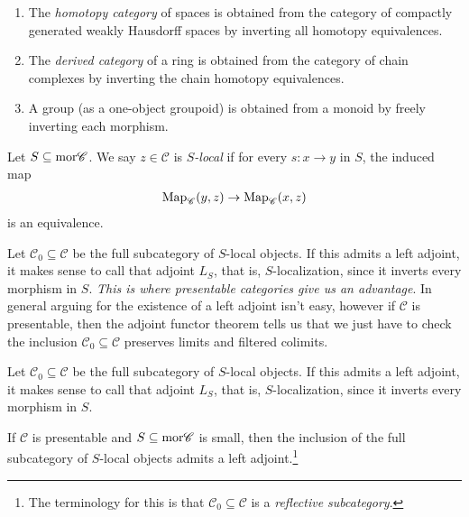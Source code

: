 \documentclass[11pt]{amsart}
\begin{document}
\begin{example} $\ $
\begin{enumerate}
    \item The \textit{homotopy category} of spaces is obtained from the category of compactly generated weakly Hausdorff spaces by inverting all homotopy equivalences.
    \item The \textit{derived category} of a ring is obtained from the category of chain complexes by inverting the chain homotopy equivalences.
    \item A group (as a one-object groupoid) is obtained from a monoid by freely inverting each morphism.
\end{enumerate}
\end{example}



\begin{definition} \cite[5.5.4.1]{HTT} Let $S \subseteq \mathrm{mor} \mathscr{C}$. We say $z\in \mathscr{C}$ is $S$\textit{-local} if for every $s \colon x \to y$ in $S$, the induced map
\begin{align*}
    \mathrm{Map}_{\mathscr{C}}(y,z) \to \mathrm{Map}_{\mathscr{C}}(x,z)
\end{align*}
is an equivalence.
\end{definition}

\begin{remark} Let $\mathscr{C}_0 \subseteq \mathscr{C}$ be the full subcategory of $S$-local objects. If this admits a left adjoint, it makes sense to call that adjoint $L_S$, that is, $S$-localization, since it inverts every morphism in $S$. \textit{This is where presentable categories give us an advantage}. In general arguing for the existence of a left adjoint isn't easy, however if $\mathscr{C}$ is presentable, then the adjoint functor theorem tells us that we just have to check the inclusion $\mathscr{C}_0 \subseteq \mathscr{C}$ preserves limits and filtered colimits.
\end{remark}
Let $\mathscr{C}_0 \subseteq \mathscr{C}$ be the full subcategory of $S$-local objects. If this admits a left adjoint, it makes sense to call that adjoint $L_S$, that is, $S$-localization, since it inverts every morphism in $S$.

\begin{proposition} \cite[5.5.4.15]{HTT} If $\mathscr{C}$ is presentable and $S \subseteq \mathrm{mor} \mathscr{C}$ is small, then the inclusion of the full subcategory of $S$-local objects admits a left adjoint.\footnote{The terminology for this is that $\mathscr{C}_0 \subseteq \mathscr{C}$ is a \textit{reflective subcategory}.}
\end{proposition}
\end{document}
